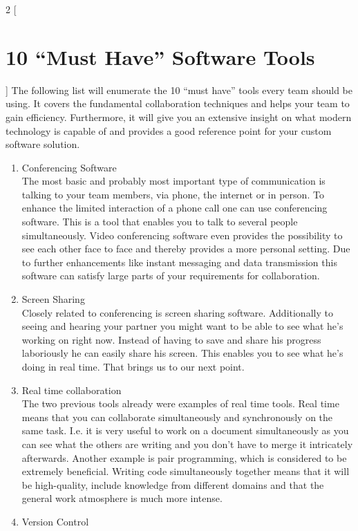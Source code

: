 \begin{multicols}{2}
[\section{10 “Must Have” Software Tools}]
The following list will enumerate the 10 “must have” tools every team should be using. It covers the fundamental collaboration techniques and helps your team to gain efficiency. Furthermore, it will give you an extensive insight on what modern technology is capable of and provides a good reference point for your custom software solution.
\begin{enumerate}[1.]
  \item Conferencing Software\\
The most basic and probably most important type of communication is talking to your team members, via phone, the internet or in person. To enhance the limited interaction of a phone call one can use conferencing software. This is a tool that enables you to talk to several people simultaneously. Video conferencing software even provides the possibility to see each other face to face and thereby provides a more personal setting. Due to further enhancements like instant messaging and data transmission this software can satisfy large parts of your requirements for collaboration.
  \item Screen Sharing\\
Closely related to conferencing is screen sharing software. Additionally to seeing and hearing your partner you might want to be able to see what he’s working on right now. Instead of having to save and share his progress laboriously he can easily share his screen. This enables you to see what he’s doing in real time. That brings us to our next point.
	\item Real time collaboration\\
The two previous tools already were examples of real time tools. Real time means that you can collaborate simultaneously and synchronously on the same task. I.e. it is very useful to work on a document simultaneously as you can see what the others are writing and you don’t have to merge it intricately afterwards. Another example is pair programming, which is considered to be extremely beneficial.\cite{TC} Writing code simultaneously together means that it will be high-quality, include knowledge from different domains and that the general work atmosphere is much more intense.
	\item Version Control\\

\end{enumerate}
\end{multicols}
